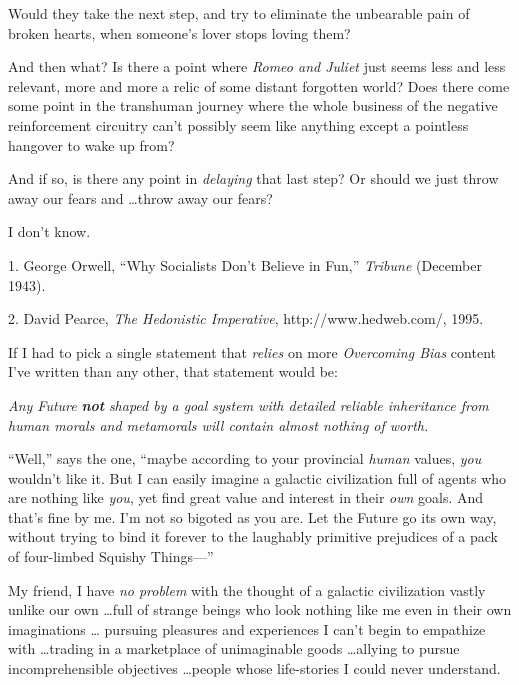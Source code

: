 {
 Would they take the next step, and try to eliminate the unbearable
pain of broken hearts, when someone's lover stops
loving them?}

{
 And then what? Is there a point where \textit{Romeo and Juliet}
just seems less and less relevant, more and more a relic of some
distant forgotten world? Does there come some point in the transhuman
journey where the whole business of the negative reinforcement
circuitry can't possibly seem like anything except a
pointless hangover to wake up from?}

{
 And if so, is there any point in \textit{delaying} that last step?
Or should we just throw away our fears and \ldots throw away our fears?}

{
 I don't know.}

\myendsectiontext


\bigskip

{
 1. George Orwell, ``Why Socialists
Don't Believe in Fun,''
\textit{Tribune} (December 1943).}

{
 2. David Pearce, \textit{The Hedonistic Imperative},
http://www.hedweb.com/, 1995.}


{
 If I had to pick a single statement that \textit{relies} on more
\textit{Overcoming Bias} content I've written than any
other, that statement would be: }

{
 \textit{Any Future }\textbf{\textit{not}}\textit{ shaped by a goal
system with detailed reliable inheritance from human morals and
metamorals will contain almost nothing of worth.}}

{
 ``Well,'' says the one,
``maybe according to your provincial \textit{human}
values, \textit{you} wouldn't like it. But I can easily
imagine a galactic civilization full of agents who are nothing like
\textit{you}, yet find great value and interest in their \textit{own}
goals. And that's fine by me. I'm not
so bigoted as you are. Let the Future go its own way, without trying to
bind it forever to the laughably primitive prejudices of a pack of
four-limbed Squishy Things---''}

{
 My friend, I have \textit{no problem} with the thought of a
galactic civilization vastly unlike our own \ldots full of strange
beings who look nothing like me even in their own imaginations \ldots
pursuing pleasures and experiences I can't begin to
empathize with \ldots trading in a marketplace of unimaginable goods
\ldots allying to pursue incomprehensible objectives \ldots people whose
life-stories I could never understand.}

